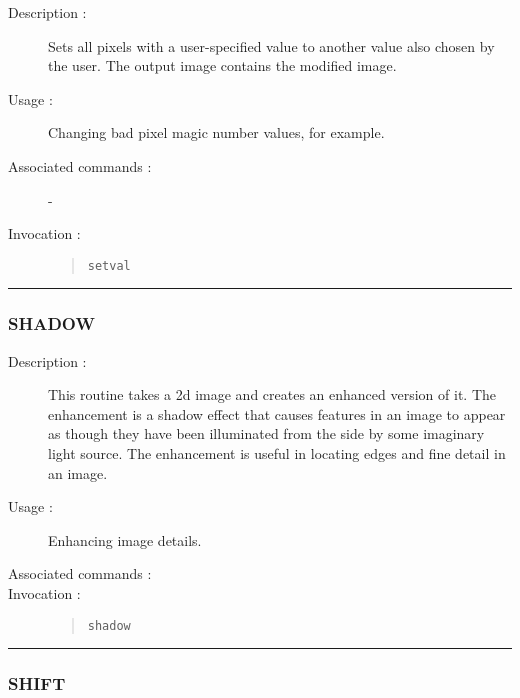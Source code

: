 \begin{description}

\item[Description :] Sets all pixels with a user-specified value to
another value also chosen by the user.  The output image contains the
modified image.

\item[Usage :] Changing bad pixel magic number values, for example.
\item[Associated commands :] -
\item[Invocation :]

\begin{quote}{\tt  setval }\end{quote}

\end{description}

\hrule 
\subsubsection*{\label{SHADOW}SHADOW}

\begin{description}

\item[Description :] This routine takes a 2d image and creates an
enhanced version of it. The enhancement is a shadow effect that causes
features in an image to appear as though they have been illuminated
from the side by some imaginary light source. The enhancement is useful
in locating edges and fine detail in an image.

\item[Usage :] Enhancing image details.
\item[Associated commands :] {\tt {}}
\item[Invocation :]

\begin{quote}{\tt  shadow }\end{quote}

\end{description}

\hrule 
\subsubsection*{\label{SHIFT}SHIFT}

